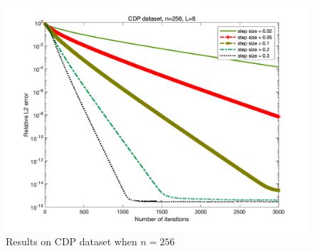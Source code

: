\documentclass{article}
\begin{document}
\begin{figure}
\begin{minipage}{0.33\linewidth}
		\includegraphics[width=1\linewidth]{./fig/CDP+22.png}
		\caption{$L=12$}
	\end{minipage}
	\caption*{Results on CDP dataset when $n=256$}
\end{figure}
\end{document}
